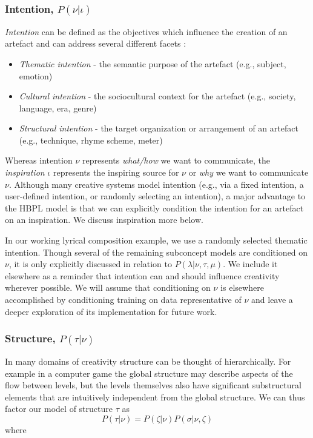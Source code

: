 \documentclass[phd,electronic,oneside,twosidetoc,letterpaper,chaptercenter,parttop,lol,lof,lot]{byumsphd}
\begin{document}
\subsubsection{Intention, $P(\nu|\iota)$}

\emph{Intention} can be defined as the objectives which influence the creation of an artefact and can address several different facets \cite{bay2017ICCC}:

\begin{itemize}  
\item \emph{Thematic intention} - the semantic purpose of the artefact (e.g., subject, emotion)
\item \emph{Cultural intention} - the sociocultural context for the artefact (e.g., society, language, era, genre)
\item \emph{Structural intention} - the target organization or arrangement of an artefact (e.g., technique, rhyme scheme, meter)
\end{itemize}

Whereas intention $\nu$ represents \emph{what/how} we want to communicate, the \emph{inspiration} $\iota$ represents the inspiring source for $\nu$ or \emph{why} we want to communicate $\nu$. Although many creative systems model intention (e.g., via a fixed intention, a user-defined intention, or randomly selecting an intention), a major advantage to the HBPL model is that we can explicitly condition the intention for an artefact on an inspiration. We discuss inspiration more below. 

In our working lyrical composition example, we use a randomly selected thematic intention. Though several of the remaining subconcept models are conditioned on $\nu$, it is only explicitly discussed in relation to $P(\lambda|\nu,\tau,\mu)$. We include it elsewhere as a reminder that intention can and should influence creativity wherever possible. We will assume that conditioning on $\nu$ is elsewhere accomplished by conditioning training on data representative of $\nu$ and leave a deeper exploration of its implementation for future work.

\subsubsection{Structure, $P(\tau|\nu)$}

In many domains of creativity structure can be thought of hierarchically. For example in a computer game the global structure may describe aspects of the flow between levels, but the levels themselves also have significant substructural elements that are intuitively independent from the global structure. We can thus factor our model of structure $\tau$ as
\[ P(\tau|\nu) = P(\zeta|\nu)P(\sigma|\nu,\zeta) \]
\noindent where 
\end{document}
